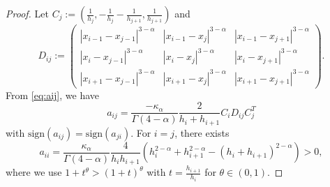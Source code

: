 \documentclass{amsart}
\theoremstyle{definition}
\theoremstyle{remark}
\numberwithin{equation}{section}
\begin{document}
\begin{proof}
Let $C_j := \left( \frac{1}{h_j}, -\frac{1}{h_j}-\frac{1}{h_{j+1}}, \frac{1}{h_{j+1}} \right)$
and
\begin{equation*}
    D_{ij} := \begin{pmatrix}
        |x_{i-1} - x_{j-1}|^{3-\alpha} & |x_{i-1} - x_{j}|^{3-\alpha} &|x_{i-1} - x_{j+1}|^{3-\alpha} \\
        |x_{i} - x_{j-1}|^{3-\alpha} & |x_{i} - x_{j}|^{3-\alpha} &|x_{i} - x_{j+1}|^{3-\alpha} \\
        |x_{i+1} - x_{j-1}|^{3-\alpha} & |x_{i+1} - x_{j}|^{3-\alpha} &|x_{i+1} - x_{j+1}|^{3-\alpha}
    \end{pmatrix} .
\end{equation*}
From \eqref{eq:aij}, we have 
\begin{equation*}
    a_{ij} = \frac{-\kappa_\alpha}{\Gamma(4-\alpha)}\frac{2}{h_i+h_{i+1}} C_i D_{ij} C_j^T  
\end{equation*}
with $\text{sign}(a_{ij}) = \text{sign}(a_{ji})$.
For \(i=j\), there exists
 \begin{equation*}
     a_{ii} = \frac{\kappa_\alpha}{\Gamma(4-\alpha)}\frac{4}{h_i h_{i+1}} \left( h_i^{2-\alpha} + h_{i+1}^{2-\alpha} - (h_i+h_{i+1})^{2-\alpha} \right) > 0,
 \end{equation*}
 where we use $ 1 + t^\theta >  (1+t)^\theta$ with $t=\frac{h_{i+1}}{h_{i}}$ for $\theta\in (0,1)$.
 

\end{proof}
\end{document}
